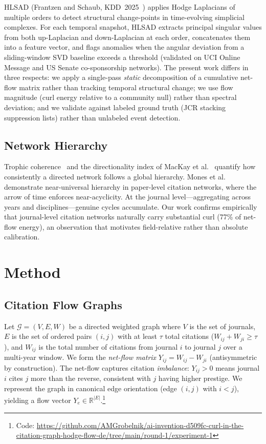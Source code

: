 \documentclass[twocolumn,11pt,letterpaper]{article}
\begin{document}
HLSAD (Frantzen and Schaub, KDD~2025~\cite{Frantzen2025}) applies Hodge
Laplacians of multiple orders to detect structural change-points in
time-evolving simplicial complexes. For each temporal snapshot, HLSAD extracts
principal singular values from both up-Laplacian and down-Laplacian at each
order, concatenates them into a feature vector, and flags anomalies when the
angular deviation from a sliding-window SVD baseline exceeds a threshold
(validated on UCI Online Message and US Senate co-sponsorship networks). The
present work differs in three respects: we apply a single-pass \emph{static}
decomposition of a cumulative net-flow matrix rather than tracking temporal
structural change; we use flow magnitude (curl energy relative to a community
null) rather than spectral deviation; and we validate against labeled ground
truth (JCR stacking suppression lists) rather than unlabeled event detection.

\subsection{Network Hierarchy}

Trophic coherence~\cite{Johnson2014} and the directionality index of MacKay et
al.~\cite{MacKay2020} quantify how consistently a directed network follows a
global hierarchy. Mones et al.~\cite{Mones2014} demonstrate near-universal
hierarchy in paper-level citation networks, where the arrow of time enforces
near-acyclicity. At the journal level---aggregating across years and
disciplines---genuine cycles accumulate. Our work confirms empirically that
journal-level citation networks naturally carry substantial curl (77\% of
net-flow energy), an observation that motivates field-relative rather than
absolute calibration.

\section{Method}
\label{sec:method}

\subsection{Citation Flow Graphs}

Let $\mathcal{G} = (V, E, W)$ be a directed weighted graph where $V$ is the
set of journals, $E$ is the set of ordered pairs $(i,j)$ with at least $\tau$
total citations ($W_{ij} + W_{ji} \geq \tau$), and $W_{ij}$ is the total
number of citations from journal $i$ to journal $j$ over a multi-year window.
We form the \emph{net-flow matrix} $Y_{ij} = W_{ij} - W_{ji}$
(antisymmetric by construction). The net-flow captures citation
\emph{imbalance}: $Y_{ij} > 0$ means journal $i$ cites $j$ more than the
reverse, consistent with $j$ having higher prestige. We represent the graph in
canonical edge orientation (edge $(i,j)$ with $i < j$), yielding a flow vector
$Y_e \in \mathbb{R}^{|E|}$.\footnote{Code: \url{https://github.com/AMGrobelnik/ai-invention-d509fc-curl-in-the-citation-graph-hodge-flow-de/tree/main/round-1/experiment-1}}
\end{document}
